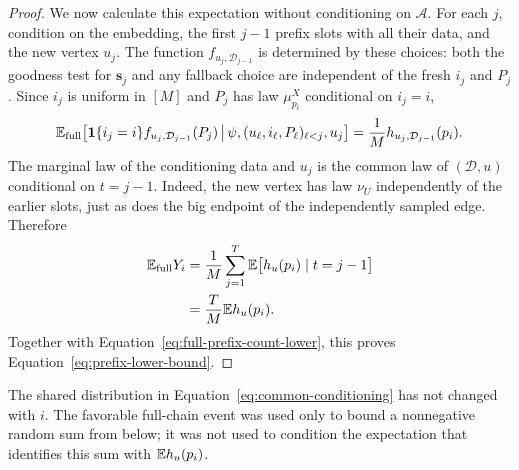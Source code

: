 \begin{proof}
We now calculate this expectation without conditioning on
$\mathcal A$.  For each $j$, condition on the embedding, the
first $j-1$ prefix slots with all their data, and the new
vertex $u_j$.  The function
$f_{u_j,\mathcal D_{j-1}}$ is determined by these choices:
both the goodness test for $\mathbf s_j$ and any fallback
choice are independent of the fresh $i_j$ and $P_j$.
Since $i_j$ is uniform in $[M]$ and $P_j$ has law
$\mu_{p_i}^X$ conditional on $i_j=i$,
\[
  \mathbb E_{\mathrm{full}}\!\left[
    \mathbf 1\{i_j=i\} f_{u_j,\mathcal D_{j-1}}(P_j)
    \,\middle|\,
    \psi,(u_\ell,i_\ell,P_\ell)_{\ell<j},u_j
  \right]
  =\frac1M h_{u_j,\mathcal D_{j-1}}(p_i).
\]
The marginal law of the conditioning data and $u_j$ is the
common law of $(\mathcal D,u)$ conditional on $t=j-1$.
Indeed, the new vertex has law $\nu_U$ independently of
the earlier slots, just as does the big endpoint of the
independently sampled edge.  Therefore
\begin{align*}
  \mathbb E_{\mathrm{full}}Y_i
  &=\frac1M\sum_{j=1}^T
      \mathbb E\bigl[h_u(p_i)\mid t=j-1\bigr]\\
  &=\frac TM\mathbb E h_u(p_i).
\end{align*}
Together with Equation~\eqref{eq:full-prefix-count-lower},
this proves Equation~\eqref{eq:prefix-lower-bound}.
\end{proof}

The shared distribution in
Equation~\eqref{eq:common-conditioning} has not changed with
$i$.  The favorable full-chain event was used only to bound
a nonnegative random sum from below; it was not used to
condition the expectation that identifies this sum with
$\mathbb E h_u(p_i)$.
